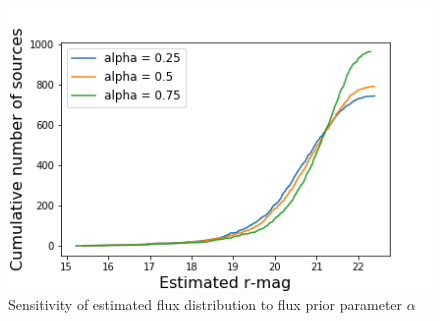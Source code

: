 \begin{figure}
    \centering
    \includegraphics{figures/sensitivity_cdf_fluxes.png}
    \caption{Sensitivity of estimated flux distribution to flux prior parameter $\alpha$}
    \label{fig:cdf_sensitivity}
\end{figure}